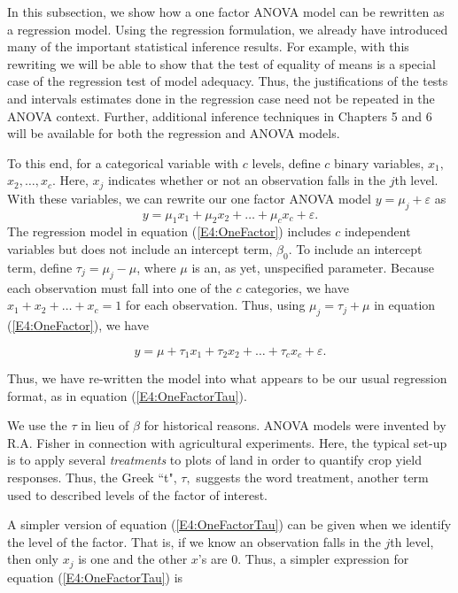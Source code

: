 In this subsection, we show how a one factor ANOVA model can be
rewritten as a regression model. Using the regression formulation,
we already have introduced many of the important statistical
inference results. For example, with this rewriting we will be able
to show that the test of equality of means is a special case of the
regression test of model adequacy. Thus, the justifications of the
tests and intervals estimates done in the regression case need not
be repeated in the ANOVA context. Further, additional inference
techniques in Chapters 5 and 6 will be available for both the
regression and ANOVA models.

To this end, for a categorical variable with $c$ levels, define $c$
binary variables, $x_1,$ $x_2,\ldots ,x_{c}$. Here, $x_{j}$
indicates whether or not an observation falls in the $j$th level.
With these variables, we can rewrite our one factor ANOVA model $
y=\mu_{j}+ \varepsilon$ as
\begin{equation}\label{E4:OneFactor}
y=\mu_1x_1+\mu_2x_2+\ldots +\mu_cx_{c}+\varepsilon.
\end{equation}
The regression model in equation (\ref{E4:OneFactor}) includes $c$
independent variables but does not include an intercept term, $\beta
_0$. To include an intercept term, define $\tau_{j}=\mu_{j}-\mu $,
where $\mu $ is an, as yet, unspecified parameter. Because each
observation must fall into one of the $c$ categories, we have
$x_1+x_2+\ldots +x_{c}=1$ for each observation. Thus, using $\mu
_{j} = \tau_j + \mu $ in equation (\ref{E4:OneFactor}), we have

\begin{equation}\label{E4:OneFactorTau}
y=\mu +\tau_1x_1+\tau_2x_2+\ldots +\tau_{c}x_{c}+\varepsilon.
\end{equation}

\noindent Thus, we have re-written the model into what appears to be
our usual regression format, as in equation (\ref{E4:OneFactorTau}).

We use the $\tau $ in lieu of $\beta $ for historical reasons. ANOVA
models were invented by R.A. Fisher in connection with agricultural
experiments. Here, the typical set-up is to apply several
\textit{treatments} to plots of land in order to quantify crop yield
responses. Thus, the Greek ``t", $\tau ,$ suggests the word
treatment, another term used to described levels of the factor of
interest.

A simpler version of equation (\ref{E4:OneFactorTau}) can be given
when we identify the level of the factor. That is, if we know an
observation falls in the $j$th level, then only $x_{j}$ is one and
the other $x$'s are 0. Thus, a simpler expression for equation
(\ref{E4:OneFactorTau}) is

